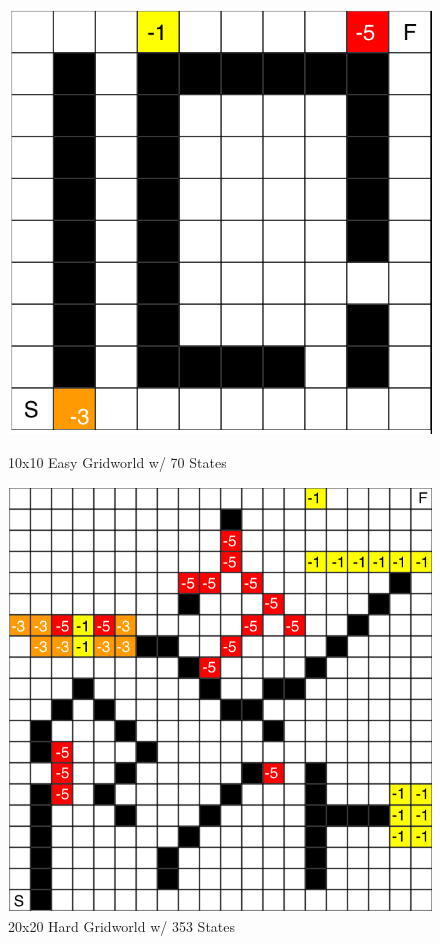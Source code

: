 \documentclass[h]{article}
\begin{document}
  \begin{figure}[H]
   \endminipage\hfill
      \includegraphics[width=1\textwidth,keepaspectratio]{easy-grid.png} 
      \caption*{10x10 Easy Gridworld w/ 70 States} 
   \endminipage\hfill
      \includegraphics[width=1\textwidth,keepaspectratio]{hard-grid.png} 
      \caption*{20x20 Hard Gridworld w/ 353 States} 
   \endminipage\hfill
   \endminipage\hfill
\end{figure}
\end{document}
